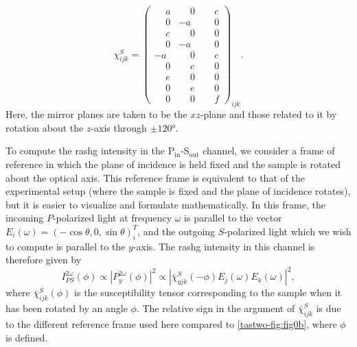 \begin{equation}
\label{tastwo-eq:Sc3vsusceptibility}
\chi^S_{ijk} = \begin{pmatrix}
\phantom{-}a & \phantom{-}0 & \phantom{-}c\\
\phantom{-}0 & -a & \phantom{-}0\\
\phantom{-}c & \phantom{-}0 & \phantom{-}0\\
\hline
\phantom{-}0 & -a & \phantom{-}0\\
-a & \phantom{-}0 & \phantom{-}c\\
\phantom{-}0 & \phantom{-}c & \phantom{-}0\\
\hline
\phantom{-}e & \phantom{-}0 & \phantom{-}0\\
\phantom{-}0 & \phantom{-}e & \phantom{-}0\\
\phantom{-}0 & \phantom{-}0 & \phantom{-}f
\end{pmatrix}_{ijk}.
\end{equation}
Here, the mirror planes are taken to be the $xz$-plane and those related to it by rotation about the $z$-axis through $\pm \ang{120}$.

To compute the \gls{rashg} intensity in the P$_\mathrm{in}$-S$_\mathrm{out}$ channel, we consider a frame of reference in which the plane of incidence is held fixed and the sample is rotated about the optical axis.
This reference frame is equivalent to that of the experimental setup (where the sample is fixed and the plane of incidence rotates), but it is easier to visualize and formulate mathematically.
In this frame, the incoming $P$-polarized light at frequency $\omega$ is parallel to the vector $E_i(\omega) = (-\cos{\theta}, 0, \sin{\theta})^T_i$, and the outgoing $S$-polarized light which we wish to compute is parallel to the $y$-axis.
The \gls{rashg} intensity in this channel is therefore given by
\begin{equation}
\label{tastwo-eq:Sipsequation}
I_{PS}^{2\omega}(\phi) \propto \left|P_y^{2\omega}(\phi)\right|^2 \propto \left|\bar{\chi}^S_{yjk}(-\phi)E_j(\omega)E_k(\omega)\right|^2,
\end{equation}
where $\bar{\chi}^S_{ijk}(\phi)$ is the susceptibility tensor corresponding to the sample when it has been rotated by an angle $\phi$.
The relative sign in the argument of $\bar{\chi}^S_{ijk}$ is due to the different reference frame used here compared to \cref{tastwo-fig:fig0b}, where $\phi$ is defined.

